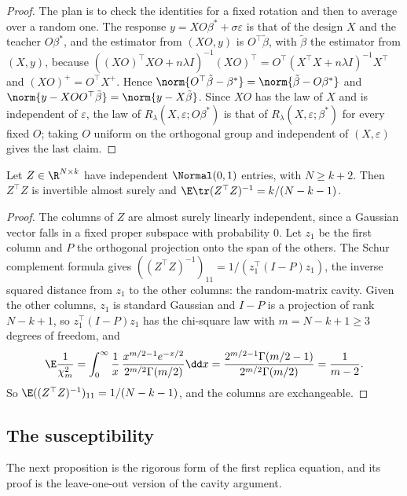 \begin{refsection}
\begin{proof}
The plan is to check the identities for a fixed rotation and then to average over a random one. The response $y=XO\beta^*+\sigma\varepsilon$ is that of the design $X$ and the teacher $O\beta^*$, and the estimator from $(XO,y)$ is $O^\top\tilde\beta$, with $\tilde\beta$ the estimator from $(X,y)$, because $((XO)^\top XO+n\lambda I)^{-1}(XO)^\top=O^\top(X^\top X+n\lambda I)^{-1}X^\top$ and $(XO)^+=O^\top X^+$. Hence $\norm{O^\top\tilde\beta-\beta^*}=\norm{\tilde\beta-O\beta^*}$ and $\norm{y-XOO^\top\tilde\beta}=\norm{y-X\tilde\beta}$. Since $XO$ has the law of $X$ and is independent of $\varepsilon$, the law of $R_\lambda(X,\varepsilon;O\beta^*)$ is that of $R_\lambda(X,\varepsilon;\beta^*)$ for every fixed $O$; taking $O$ uniform on the orthogonal group and independent of $(X,\varepsilon)$ gives the last claim.
\end{proof}

\begin{lemma}\label{lem:ridge:wishart}
Let $Z\in\R^{N\times k}$ have independent $\Normal(0,1)$ entries, with $N\ge k+2$. Then $Z^\top Z$ is invertible almost surely and $\E\tr(Z^\top Z)^{-1}=k/(N-k-1)$.
\end{lemma}

\begin{proof}
The columns of $Z$ are almost surely linearly independent, since a Gaussian vector falls in a fixed proper subspace with probability $0$. Let $z_1$ be the first column and $P$ the orthogonal projection onto the span of the others. The Schur complement formula gives $((Z^\top Z)^{-1})_{11}=1/(z_1^\top(I-P)z_1)$, the inverse squared distance from $z_1$ to the other columns: the random-matrix cavity. Given the other columns, $z_1$ is standard Gaussian and $I-P$ is a projection of rank $N-k+1$, so $z_1^\top(I-P)z_1$ has the chi-square law with $m=N-k+1\ge3$ degrees of freedom, and
\[
\E\frac1{\chi^2_m}=\int_0^\infty\frac1x\,\frac{x^{m/2-1}e^{-x/2}}{2^{m/2}\Gamma(m/2)}\dd x=\frac{2^{m/2-1}\Gamma(m/2-1)}{2^{m/2}\Gamma(m/2)}=\frac1{m-2}.
\]
So $\E((Z^\top Z)^{-1})_{11}=1/(N-k-1)$, and the columns are exchangeable.
\end{proof}

\subsection{The susceptibility}

The next proposition is the rigorous form of the first replica equation, and its proof is the leave-one-out version of the cavity argument.


\end{refsection}
